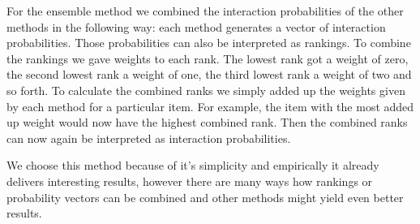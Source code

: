 For the ensemble method we combined the interaction probabilities of the other methods in the following way: each method generates a vector of interaction probabilities. Those probabilities can also be interpreted as rankings. To combine the rankings we gave weights to each rank. The lowest rank got a weight of zero, the second lowest rank a weight of one, the third lowest rank a weight of two and so forth. To calculate the combined ranks we simply added up the weights given by each method for a particular item. For example, the item with the most added up weight would now have the highest combined rank. Then the combined ranks can now again be interpreted as interaction probabilities.

We choose this method because of it's simplicity and empirically it already delivers interesting results, however there are many ways how rankings or probability vectors can be combined and other methods might yield even better results.
